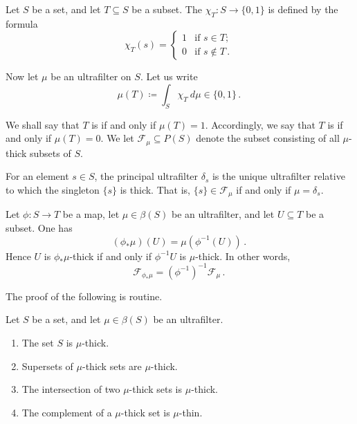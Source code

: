 \begin{definition}
	Let $ S $ be a set, and
	let $ T \subseteq S$ be a subset.
	The 
	$ \chi_T \colon S \to \{ 0,1 \}$
	is defined by the formula
	\[
		\chi_T(s) =
		\begin{cases}
			1 & \text{if } s \in T \semicolon \\
			0 & \text{if } s \notin T \period
		\end{cases}
	\]
	
	Now let $ \mu $ be an ultrafilter on $ S $.
	Let us write
	\[
		\mu(T) \coloneq
		\int_S \chi_T \ d \mu \in
		\{ 0,1 \} \period
	\]
	
	We shall say that $ T $ is 
	if and only if $\mu(T) = 1$.
	Accordingly, we say that $ T $ is 
	if and only if $ \mu(T) = 0 $.
	We let $ \mathscr{F}_{\mu} \subseteq P(S) $ denote
	the subset consisting of all $ \mu $-thick subsets of $ S $.
\end{definition}

\begin{eg}
	For an element $ s \in S$,
	the principal ultrafilter $ \delta_s $ is
	the unique ultrafilter relative to which
	the singleton $ \{ s \} $ is thick.
	That is, $ \{ s \} \in \mathscr{F}_{\mu} $
	if and only if $ \mu = \delta_s $.
\end{eg}

\begin{eg}
	Let $ \phi \colon S \to T $ be a map,
	let $ \mu \in \beta(S) $ be an ultrafilter, and
	let $ U \subseteq T $ be a subset.
	One has
	\[ (\phi_{\ast} \mu)(U) = \mu (\phi^{-1}(U)) \period \]
	Hence $ U $ is $ \phi_{\ast} \mu $-thick
	if and only if $ \phi^{-1} U $ is $ \mu $-thick.
	In other words,
	\[
		\mathscr{F}_{\phi_{\ast} \mu} =
		(\phi^{-1})^{-1} \mathscr{F}_{\mu} \period
	\]
\end{eg}

The proof of the following is routine.

\begin{lemma}
	Let $ S $ be a set, and
	let $ \mu \in \beta(S) $ be an ultrafilter.
	\begin{enumerate}
		\item The set $ S $ is $ \mu $-thick.
		\item Supersets of $ \mu $-thick sets are $ \mu $-thick.
		\item The intersection of two $ \mu $-thick sets
			is $ \mu $-thick.
		\item The complement of a $ \mu $-thick set
			is $ \mu $-thin.
	\end{enumerate}
\end{lemma}

